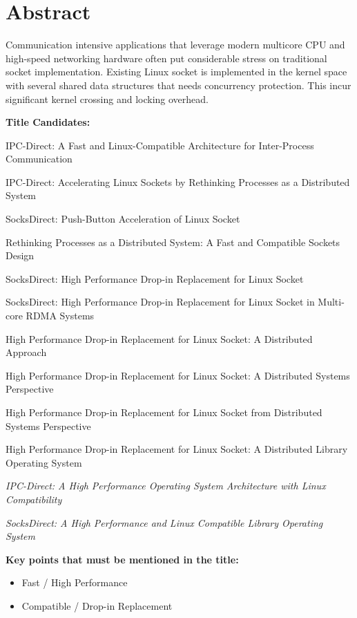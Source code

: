 \section*{Abstract}
Communication intensive applications that leverage modern multicore CPU and high-speed networking hardware often put 
considerable stress on traditional socket implementation. Existing Linux socket is implemented in the kernel 
space with several shared data structures that needs concurrency protection. This incur significant kernel crossing 
and locking overhead. 


\iffalse
\textbf{Title Candidates:}


IPC-Direct: A Fast and Linux-Compatible Architecture for Inter-Process Communication



IPC-Direct: Accelerating Linux Sockets by Rethinking Processes as a Distributed System

SocksDirect: Push-Button Acceleration of Linux Socket

Rethinking Processes as a Distributed System: A Fast and Compatible Sockets Design

SocksDirect: High Performance Drop-in Replacement for Linux Socket

SocksDirect: High Performance Drop-in Replacement for Linux Socket in Multi-core RDMA Systems

High Performance Drop-in Replacement for Linux Socket: A Distributed Approach

High Performance Drop-in Replacement for Linux Socket: A Distributed Systems Perspective

High Performance Drop-in Replacement for Linux Socket from Distributed Systems Perspective

High Performance Drop-in Replacement for Linux Socket: A Distributed Library Operating System

\textit{IPC-Direct: A High Performance Operating System Architecture with Linux Compatibility}

\textit{SocksDirect: A High Performance and Linux Compatible Library Operating System}

\textbf{Key points that must be mentioned in the title:}

\begin{itemize}
	\item Fast / High Performance
	\item Compatible / Drop-in Replacement
\end{itemize}

